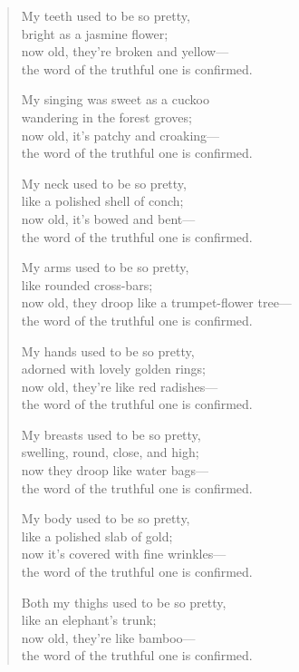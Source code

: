 \documentclass[12pt,openany]{book}%
\begin{document}
\begin{verse}
My teeth used to be so pretty, \\
bright as a jasmine flower; \\
now old, they’re broken and yellow—\\
the word of the truthful one is confirmed. 

My singing was sweet as a cuckoo \\
wandering in the forest groves; \\
now old, it’s patchy and croaking—\\
the word of the truthful one is confirmed. 

My neck used to be so pretty, \\
like a polished shell of conch; \\
now old, it’s bowed and bent—\\
the word of the truthful one is confirmed. 

My arms used to be so pretty, \\
like rounded cross-bars; \\
now old, they droop like a trumpet-flower tree—\\
the word of the truthful one is confirmed. 

My hands used to be so pretty, \\
adorned with lovely golden rings; \\
now old, they’re like red radishes—\\
the word of the truthful one is confirmed. 

My breasts used to be so pretty, \\
swelling, round, close, and high; \\
now they droop like water bags—\\
the word of the truthful one is confirmed. 

My body used to be so pretty, \\
like a polished slab of gold; \\
now it’s covered with fine wrinkles—\\
the word of the truthful one is confirmed. 

Both my thighs used to be so pretty, \\
like an elephant’s trunk; \\
now old, they’re like bamboo—\\
the word of the truthful one is confirmed. 


\end{verse}
\end{document}
